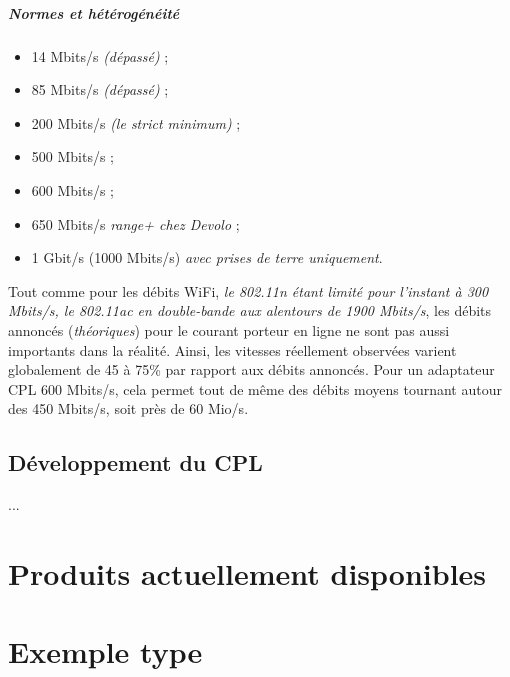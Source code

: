             \paragraph{Normes et hétérogénéité}
                \begin{itemize}
                    \item 14 Mbits/s \emph{(dépassé)} ;
                    \item 85 Mbits/s \emph{(dépassé)} ;
                    \item 200 Mbits/s \emph{(le strict minimum)} ;
                    \item 500 Mbits/s ;
                    \item 600 Mbits/s ;
                    \item 650 Mbits/s \emph{range+ chez Devolo} ;
                    \item 1 Gbit/s (1000 Mbits/s) \emph{avec prises de terre uniquement}.
                \end{itemize}
Tout comme pour les débits WiFi, \emph{ le \emph{802.11n} étant limité pour l'instant à 300 Mbits/s, le \emph{802.11ac} en double-bande aux alentours de 1900 Mbits/s}, les débits annoncés (\emph{théoriques}) pour le courant porteur en ligne ne sont pas aussi importants dans la réalité.
Ainsi, les vitesses réellement observées varient globalement de 45 à 75\% par rapport aux débits annoncés.
Pour un adaptateur CPL 600 Mbits/s, cela permet tout de même des débits moyens tournant autour des 450 Mbits/s, soit près de 60 Mio/s.

    \section{Développement du CPL}
        ...



\chapter{Produits actuellement disponibles}



\chapter{Exemple type}
